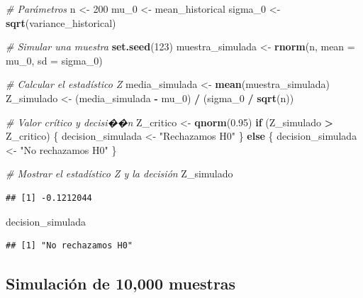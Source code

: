\documentclass[
]{article}
\newenvironment{Shaded}{\begin{snugshade}}{\end{snugshade}}
\newcommand{\AttributeTok}[1]{\textcolor[rgb]{0.13,0.29,0.53}{#1}}
\newcommand{\CommentTok}[1]{\textcolor[rgb]{0.56,0.35,0.01}{\textit{#1}}}
\newcommand{\ControlFlowTok}[1]{\textcolor[rgb]{0.13,0.29,0.53}{\textbf{#1}}}
\newcommand{\DecValTok}[1]{\textcolor[rgb]{0.00,0.00,0.81}{#1}}
\newcommand{\FloatTok}[1]{\textcolor[rgb]{0.00,0.00,0.81}{#1}}
\newcommand{\FunctionTok}[1]{\textcolor[rgb]{0.13,0.29,0.53}{\textbf{#1}}}
\newcommand{\NormalTok}[1]{#1}
\newcommand{\OtherTok}[1]{\textcolor[rgb]{0.56,0.35,0.01}{#1}}
\newcommand{\SpecialCharTok}[1]{\textcolor[rgb]{0.81,0.36,0.00}{\textbf{#1}}}
\newcommand{\StringTok}[1]{\textcolor[rgb]{0.31,0.60,0.02}{#1}}
\begin{document}
\begin{Shaded}
\begin{Highlighting}[]
\CommentTok{\# Parámetros}
\NormalTok{n }\OtherTok{\textless{}{-}} \DecValTok{200}
\NormalTok{mu\_0 }\OtherTok{\textless{}{-}}\NormalTok{ mean\_historical}
\NormalTok{sigma\_0 }\OtherTok{\textless{}{-}} \FunctionTok{sqrt}\NormalTok{(variance\_historical)}

\CommentTok{\# Simular una muestra}
\FunctionTok{set.seed}\NormalTok{(}\DecValTok{123}\NormalTok{)}
\NormalTok{muestra\_simulada }\OtherTok{\textless{}{-}} \FunctionTok{rnorm}\NormalTok{(n, }\AttributeTok{mean =}\NormalTok{ mu\_0, }\AttributeTok{sd =}\NormalTok{ sigma\_0)}

\CommentTok{\# Calcular el estadístico Z}
\NormalTok{media\_simulada }\OtherTok{\textless{}{-}} \FunctionTok{mean}\NormalTok{(muestra\_simulada)}
\NormalTok{Z\_simulado }\OtherTok{\textless{}{-}}\NormalTok{ (media\_simulada }\SpecialCharTok{{-}}\NormalTok{ mu\_0) }\SpecialCharTok{/}\NormalTok{ (sigma\_0 }\SpecialCharTok{/} \FunctionTok{sqrt}\NormalTok{(n))}

\CommentTok{\# Valor crítico y decisi��n}
\NormalTok{Z\_critico }\OtherTok{\textless{}{-}} \FunctionTok{qnorm}\NormalTok{(}\FloatTok{0.95}\NormalTok{)}
\ControlFlowTok{if}\NormalTok{ (Z\_simulado }\SpecialCharTok{\textgreater{}}\NormalTok{ Z\_critico) \{}
\NormalTok{  decision\_simulada }\OtherTok{\textless{}{-}} \StringTok{"Rechazamos H0"}
\NormalTok{\} }\ControlFlowTok{else}\NormalTok{ \{}
\NormalTok{  decision\_simulada }\OtherTok{\textless{}{-}} \StringTok{"No rechazamos H0"}
\NormalTok{\}}

\CommentTok{\# Mostrar el estadístico Z y la decisión}
\NormalTok{Z\_simulado}
\end{Highlighting}
\end{Shaded}

\begin{verbatim}
## [1] -0.1212044
\end{verbatim}

\begin{Shaded}
\begin{Highlighting}[]
\NormalTok{decision\_simulada}
\end{Highlighting}
\end{Shaded}

\begin{verbatim}
## [1] "No rechazamos H0"
\end{verbatim}

\subsection{Simulación de 10,000
muestras}\label{simulaciuxf3n-de-10000-muestras}
\end{document}
